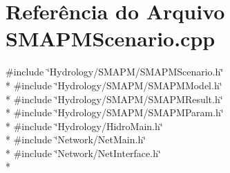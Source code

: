 \section{Referência do Arquivo S\+M\+A\+P\+M\+Scenario.\+cpp}
\label{_s_m_a_p_m_scenario_8cpp}
{\ttfamily \#include \char`\"{}Hydrology/\+S\+M\+A\+P\+M/\+S\+M\+A\+P\+M\+Scenario.\+h\char`\"{}}\\*
{\ttfamily \#include \char`\"{}Hydrology/\+S\+M\+A\+P\+M/\+S\+M\+A\+P\+M\+Model.\+h\char`\"{}}\\*
{\ttfamily \#include \char`\"{}Hydrology/\+S\+M\+A\+P\+M/\+S\+M\+A\+P\+M\+Result.\+h\char`\"{}}\\*
{\ttfamily \#include \char`\"{}Hydrology/\+S\+M\+A\+P\+M/\+S\+M\+A\+P\+M\+Param.\+h\char`\"{}}\\*
{\ttfamily \#include \char`\"{}Hydrology/\+Hidro\+Main.\+h\char`\"{}}\\*
{\ttfamily \#include \char`\"{}Network/\+Net\+Main.\+h\char`\"{}}\\*
{\ttfamily \#include \char`\"{}Network/\+Net\+Interface.\+h\char`\"{}}\\*
